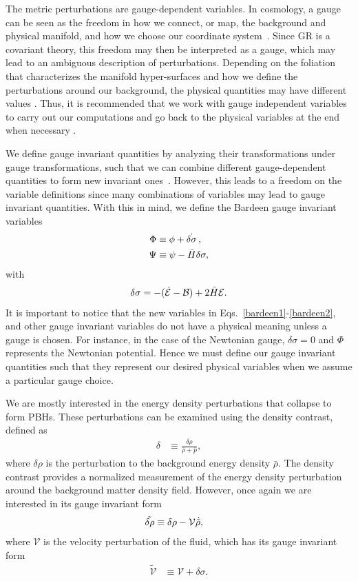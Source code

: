 \documentclass[a4paper,11pt]{article}
\begin{document}
The metric perturbations are gauge-dependent variables. In cosmology, a gauge can be
seen as the freedom in how we connect, or map, the background and physical manifold, and
how we choose our coordinate system~\cite{vitenti2012large}. Since GR is a covariant
theory, this freedom may then be interpreted as a gauge, which may lead to an ambiguous
description of perturbations. Depending on the foliation that characterizes the manifold
hyper-surfaces and how we define the perturbations around our background, the physical
quantities may have different values \cite{covariant_bardeen}. Thus, it is recommended
that we work with gauge independent variables to carry out our computations and go back
to the physical variables at the end when necessary \cite{mukhanov2005physical}.

We define gauge invariant quantities by analyzing their transformations under gauge transformations, such that we can combine different gauge-dependent quantities to form new invariant ones~\cite{covariant_bardeen}. However, this leads to a freedom on the variable definitions since many combinations of variables may lead to gauge invariant quantities. With this in mind, we define the Bardeen gauge invariant variables~\cite{Bardeen1980}
\begin{align}
	\label{bardeen1}
	\Phi & \equiv \phi + \dot{\delta \sigma}\, , \\
	\label{bardeen2}
	\Psi & \equiv \psi - \Bar{H}\delta \sigma
	,\end{align}
with
\begin{align}
	\delta\sigma = -(\dot{\mathcal{E}} - \mathcal{B}) + {2 \Bar{H}\mathcal{E}}
	.\end{align}
It is important to notice that the new variables in
Eqs.~\eqref{bardeen1}-\eqref{bardeen2}, and other gauge invariant variables do not have
a physical meaning unless a gauge is chosen. For instance, in the case of the Newtonian
gauge, $\delta\sigma = 0$ and $\Phi$ represents the Newtonian potential. Hence we must
define our gauge invariant quantities such that they represent our desired physical
variables when we assume a particular gauge choice.

We are mostly interested in the energy density perturbations that collapse to form PBHs.
These perturbations can be examined using the density contrast, defined as
\begin{align}
	\label{densitycon}
	\delta & \equiv \frac{\delta \rho}{\bar{\rho} + \bar{p}}
	,\end{align}
where $\delta\rho$ is the perturbation to the background energy density $\bar\rho$. The
density contrast provides a normalized measurement of the energy density perturbation
around the background matter density field. However, once again we are interested in its
gauge invariant form
\begin{align}
	\label{deltarhoinvariant}
	\tilde{\delta\rho} & \equiv \delta\rho - \mathcal{V} \dot{\Bar{\rho}}
	,\end{align}
where $\mathcal{V}$ is the velocity perturbation of the fluid, which has its gauge
invariant form
\begin{align}
	\tilde{\mathcal{V}} & \equiv \mathcal{V} + \delta\sigma
	.\end{align}
\end{document}
